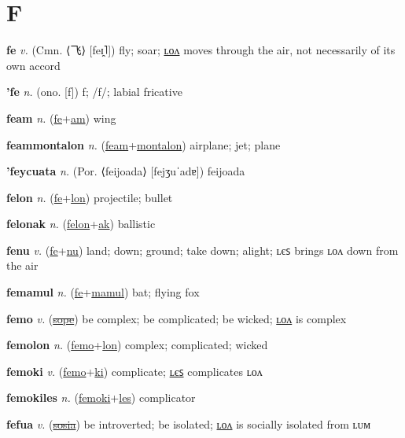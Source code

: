 \section{F}

\textbf{\hypertarget{fe}{fe}} \textit{v.} (Cmn. ⟨{\chinese{}飞}⟩ [feɪ̯˥])
fly; soar; \hyperlink{felon}{ʟᴏᴧ} moves through the air, not necessarily of its own accord

\textbf{\hypertarget{'fe}{'fe}} \textit{n.} (ono. [f])
f; /f/; labial fricative

\textbf{\hypertarget{feam}{feam}} \textit{n.} (\hyperlink{fe}{fe}+\allowbreak \hyperlink{am}{am})
wing

\textbf{\hypertarget{feammontalon}{feammontalon}} \textit{n.} (\hyperlink{feam}{feam}+\allowbreak \hyperlink{montalon}{montalon})
airplane; jet; plane

\textbf{\hypertarget{'feycuata}{'feycuata}} \textit{n.} (Por. ⟨feijoada⟩ [fejʒuˈadɐ])
feijoada

\textbf{\hypertarget{felon}{felon}} \textit{n.} (\hyperlink{fe}{fe}+\allowbreak \hyperlink{lon}{lon})
projectile; bullet

\textbf{\hypertarget{felonak}{felonak}} \textit{n.} (\hyperlink{felon}{felon}+\allowbreak \hyperlink{ak}{ak})
ballistic

\textbf{\hypertarget{fenu}{fenu}} \textit{v.} (\hyperlink{fe}{fe}+\allowbreak \hyperlink{nu}{nu})
land; down; ground; take down; alight; ʟєꜱ brings ʟᴏᴧ down from the air

\textbf{\hypertarget{femamul}{femamul}} \textit{n.} (\hyperlink{fe}{fe}+\allowbreak \hyperlink{mamul}{mamul})
bat; flying fox

\textbf{\hypertarget{femo}{femo}} \textit{v.} (\hyperlink{sope}{\sout{sope}})
be complex; be complicated; be wicked; \hyperlink{femolon}{ʟᴏᴧ} is complex

\textbf{\hypertarget{femolon}{femolon}} \textit{n.} (\hyperlink{femo}{femo}+\allowbreak \hyperlink{lon}{lon})
complex; complicated; wicked

\textbf{\hypertarget{femoki}{femoki}} \textit{v.} (\hyperlink{femo}{femo}+\allowbreak \hyperlink{ki}{ki})
complicate; \hyperlink{femokiles}{ʟєꜱ} complicates ʟᴏᴧ

\textbf{\hypertarget{femokiles}{femokiles}} \textit{n.} (\hyperlink{femoki}{femoki}+\allowbreak \hyperlink{les}{les})
complicator

\textbf{\hypertarget{fefua}{fefua}} \textit{v.} (\hyperlink{sosia}{\sout{sosia}})
be introverted; be isolated; \hyperlink{fefualon}{ʟᴏᴧ} is socially isolated from ʟᴜᴍ

